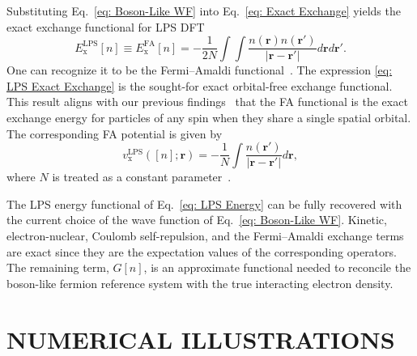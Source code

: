 \documentclass[%
 reprint,
 amsmath,amssymb,
 aps,
pra,
]{revtex4-2}
\begin{document}
Substituting Eq.~\eqref{eq: Boson-Like WF} into Eq.~\eqref{eq: Exact Exchange} yields the exact exchange functional for LPS DFT
\begin{equation}\label{eq: LPS Exact Exchange}
    E^{\text{LPS}}_{\text{x}}[n]
    \equiv
    E^{\text{FA}}_{\text{x}}[n]
    =
    -
    \frac{1}{2N}
    \int\int
    \frac{n(\textbf{r})n(\textbf{r}')}{|\textbf{r} - \textbf{r}'|}
    d\textbf{r} d\textbf{r}'.
\end{equation}
One can recognize it to be the Fermi--Amaldi functional~\cite{Fermi.1934.MRAI.6.117}.
The expression \eqref{eq: LPS Exact Exchange} is the sought-for exact orbital-free exchange functional. This result aligns with our previous findings~\cite{Bosko.2023.JCP.159.131101,Bosko.2023.PRA.108.052803} that the FA functional is the exact exchange energy for particles of any spin when they share a single spatial orbital. The corresponding FA potential is given by
\begin{equation}
    v^{\text{LPS}}_{\text{x}}([n]; \textbf{r})
    =
    -
    \frac{1}{N}
    \int\frac{n(\textbf{r}')}{|\textbf{r}-\textbf{r}'|}
    d\textbf{r},
\end{equation}
where $N$ is treated as a constant parameter~\cite{Bosko.2025.JCP.163.054108, Tozer.1997.PRA.56.2726, Parr.1995.PRA.51.3564, Gledhill.2015.JCP.143.024104, Sharpe.2018.JCTC.14.684, Dillon.2022.JCTC.18.703, Tozer.2023.JCP.159.244102}. 

The LPS energy functional of Eq.~\eqref{eq: LPS Energy} can be fully recovered with the current choice of the wave function of Eq.~\eqref{eq: Boson-Like WF}. Kinetic, electron-nuclear, Coulomb self-repulsion, and the Fermi--Amaldi exchange terms are exact since they are the expectation values of the corresponding operators. The remaining term, $G[n]$, is an approximate functional needed to reconcile the boson-like fermion reference system with the true interacting electron density. 

\section{NUMERICAL ILLUSTRATIONS}
\end{document}
